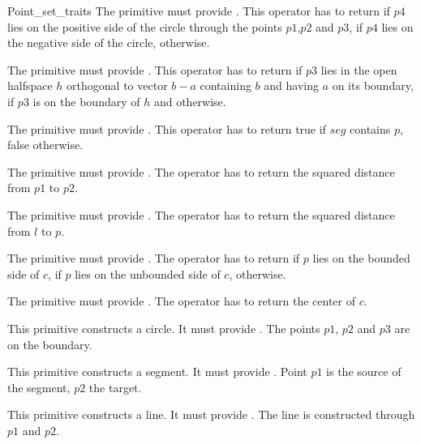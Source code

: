 \begin{ccRefConcept} {Point_set_traits}
	{The primitive must provide 
	 .
	 This operator has to return  if $p4$ lies on the positive side of the circle through
	 the points $p1$,$p2$ and $p3$,  if $p4$ lies on the negative side of the circle,
	  otherwise.
	}
	
	{The primitive must provide
	 .
	 This operator has to return  if $p3$ lies in the open halfspace $h$ orthogonal to vector
	 $b-a$ containing $b$ and having $a$ on its boundary,  if $p3$ is on the boundary of $h$ and
	  otherwise.
	}
	
	{The primitive must provide
	.
	This operator has to return true if $seg$ contains $p$, false otherwise.}
	
	{The primitive must provide 
	.
	The operator has to return the squared distance from $p1$ to $p2$.}
	
	{The primitive must provide 
	.
	The operator has to return the squared distance from $l$ to $p$.}
	
	{The primitive must provide 
	.
	The operator has to return  if $p$ lies on the bounded side of $c$,
	 if $p$ lies on the unbounded side of $c$,  otherwise.}
	
	{The primitive must provide 
	.
	The operator has to return the center of $c$.}
	
	{This primitive constructs a circle. It must provide
	.
	The points $p1$, $p2$ and $p3$ are on the boundary.} 
	
	{This primitive constructs a segment. It must provide
	.
	Point $p1$ is the source of the segment, $p2$ the target.}
	
	{This primitive constructs a line. It must provide
	.
	The line is constructed through $p1$ and $p2$.}

\end{ccRefConcept}

